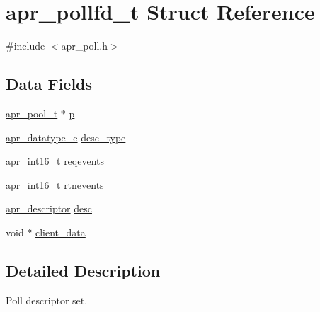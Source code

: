 \hypertarget{structapr__pollfd__t}{\section{apr\-\_\-pollfd\-\_\-t Struct Reference}
\label{structapr__pollfd__t}
}


{\ttfamily \#include $<$apr\-\_\-poll.\-h$>$}

\subsection*{Data Fields}
\begin{DoxyCompactItemize}
\item 
\hyperlink{group__apr__pools_gaf137f28edcf9a086cd6bc36c20d7cdfb}{apr\-\_\-pool\-\_\-t} $\ast$ \hyperlink{structapr__pollfd__t_adae68586ed671472590efe8770de38cc}{p}
\item 
\hyperlink{group__apr__poll_ga0a8549d84c1721788b102a4cc8b4b0f0}{apr\-\_\-datatype\-\_\-e} \hyperlink{structapr__pollfd__t_acfafd260241a874745f49ba2df246c53}{desc\-\_\-type}
\item 
apr\-\_\-int16\-\_\-t \hyperlink{structapr__pollfd__t_abcedac7097a97823a38ece6e47f4ea9f}{reqevents}
\item 
apr\-\_\-int16\-\_\-t \hyperlink{structapr__pollfd__t_aed5b2109b27984975309922bfa84e3f6}{rtnevents}
\item 
\hyperlink{unionapr__descriptor}{apr\-\_\-descriptor} \hyperlink{structapr__pollfd__t_ad63baa71bb91f80513d33482e28fb967}{desc}
\item 
void $\ast$ \hyperlink{structapr__pollfd__t_a01220e7a71963456461baa40b2a05716}{client\-\_\-data}
\end{DoxyCompactItemize}


\subsection{Detailed Description}
Poll descriptor set. 

